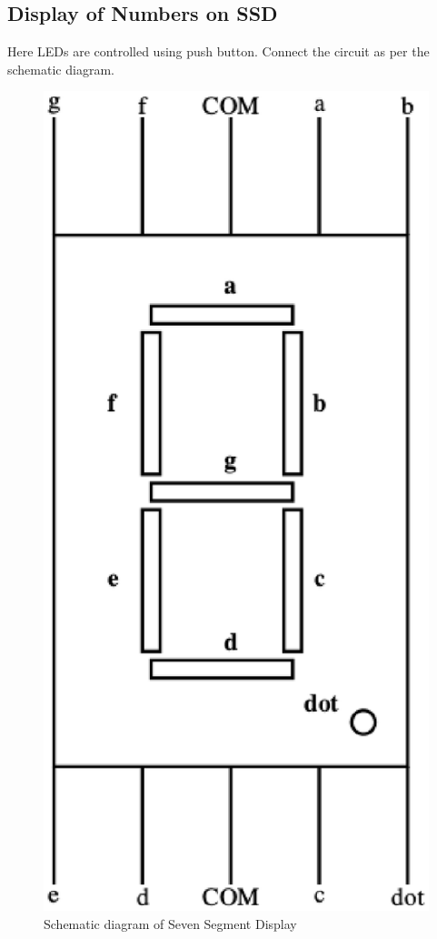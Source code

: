 \documentclass[journal,12pt,twocolumn]{IEEEtran}
\begin{document}
\subsection{Display of Numbers on SSD}
Here LEDs are controlled using push button. Connect the circuit as per the schematic diagram.
\begin{figure}[h!]
\centering
\includegraphics[scale=0.5]{figs/ssd.eps}
\caption{Schematic diagram of Seven Segment Display \cite{b2}}
\end{figure}
\end{document}
